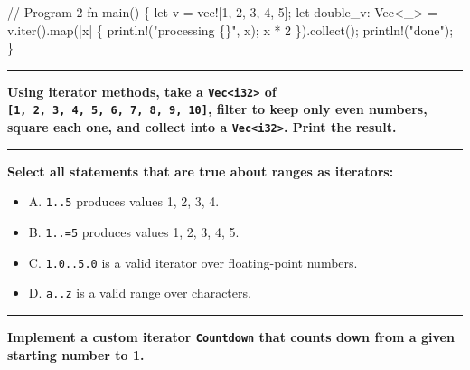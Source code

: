 \documentclass[
  11pt,
]{article}
\newenvironment{Shaded}{}{}
\newcommand{\NormalTok}[1]{#1}
\providecommand{\tightlist}{%
  \setlength{\itemsep}{0pt}\setlength{\parskip}{0pt}}
\begin{document}
\begin{Shaded}
\begin{Highlighting}[]
\NormalTok{// Program 2}
\NormalTok{fn main() \{}
\NormalTok{    let v = vec![1, 2, 3, 4, 5];}
\NormalTok{    let double\_v: Vec\textless{}\_\textgreater{} = v.iter().map(|x| \{}
\NormalTok{        println!("processing \{\}", x);}
\NormalTok{        x * 2}
\NormalTok{    \}).collect();}
\NormalTok{    println!("done");}
\NormalTok{\}}
\end{Highlighting}
\end{Shaded}

\begin{center}\rule{0.5\linewidth}{0.5pt}\end{center}

\textbf{Using iterator methods, take a
\texttt{Vec\textless{}i32\textgreater{}} of
\texttt{{[}1,\ 2,\ 3,\ 4,\ 5,\ 6,\ 7,\ 8,\ 9,\ 10{]}}, filter to keep
only even numbers, square each one, and collect into a
\texttt{Vec\textless{}i32\textgreater{}}. Print the result.}

\begin{Shaded}
\begin{Highlighting}[]

\end{Highlighting}
\end{Shaded}

\begin{center}\rule{0.5\linewidth}{0.5pt}\end{center}

\textbf{Select all statements that are true about ranges as iterators:}

\begin{itemize}
\tightlist
\item[$\square$]
  A. \texttt{1..5} produces values 1, 2, 3, 4.
\item[$\square$]
  B. \texttt{1..=5} produces values 1, 2, 3, 4, 5.
\item[$\square$]
  C. \texttt{1.0..5.0} is a valid iterator over floating-point numbers.
\item[$\square$]
  D.
  \texttt{\textquotesingle{}a\textquotesingle{}..\textquotesingle{}z\textquotesingle{}}
  is a valid range over characters.
\end{itemize}

\begin{center}\rule{0.5\linewidth}{0.5pt}\end{center}

\textbf{Implement a custom iterator \texttt{Countdown} that counts down
from a given starting number to 1.}
\end{document}
